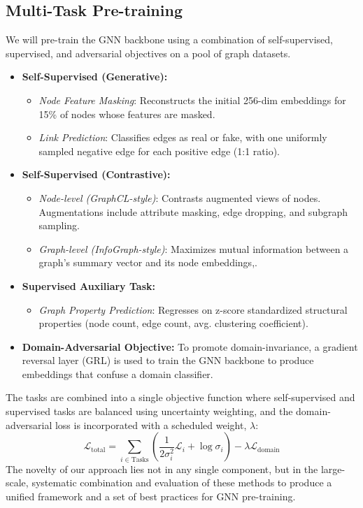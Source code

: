 \documentclass{acmart}
\begin{document}
\subsection{Multi-Task Pre-training}
We will pre-train the GNN backbone using a combination of self-supervised, supervised, and adversarial objectives on a pool of graph datasets.
\begin{itemize}
    \item \textbf{Self-Supervised (Generative):}
        \begin{itemize}
            \item \textit{Node Feature Masking}: Reconstructs the initial 256-dim embeddings for 15\% of nodes whose features are masked.
            \item \textit{Link Prediction}: Classifies edges as real or fake, with one uniformly sampled negative edge for each positive edge (1:1 ratio).
        \end{itemize}
    \item \textbf{Self-Supervised (Contrastive):}
        \begin{itemize}
            \item \textit{Node-level (GraphCL-style)}: Contrasts augmented views of nodes. Augmentations include attribute masking, edge dropping, and subgraph sampling.
            \item \textit{Graph-level (InfoGraph-style)}: Maximizes mutual information between a graph's summary vector and its node embeddings,.
        \end{itemize}
    \item \textbf{Supervised Auxiliary Task:}
        \begin{itemize}
            \item \textit{Graph Property Prediction}: Regresses on z-score standardized structural properties (node count, edge count, avg. clustering coefficient).
        \end{itemize}
    \item \textbf{Domain-Adversarial Objective:} To promote domain-invariance, a gradient reversal layer (GRL) is used to train the GNN backbone to produce embeddings that confuse a domain classifier.
\end{itemize}
The tasks are combined into a single objective function where self-supervised and supervised tasks are balanced using uncertainty weighting, and the domain-adversarial loss is incorporated with a scheduled weight, $\lambda$:
\[ \mathcal{L}_{\text{total}} = \sum_{i \in \text{Tasks}} \left( \frac{1}{2\sigma_i^2}\mathcal{L}_i + \log\sigma_i \right) - \lambda \mathcal{L}_{\text{domain}} \]
The novelty of our approach lies not in any single component, but in the large-scale, systematic combination and evaluation of these methods to produce a unified framework and a set of best practices for GNN pre-training.
\end{document}
